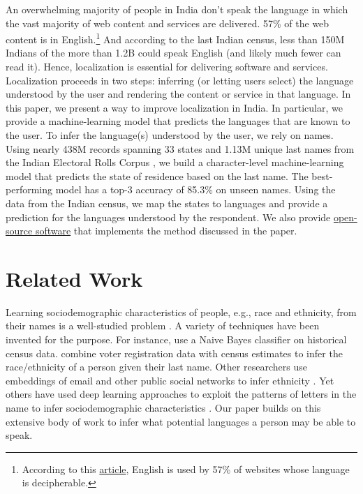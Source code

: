\documentclass[11pt,  letterpaper]{article}
\begin{document}
An overwhelming majority of people in India don’t speak the language in which the vast majority of web content and services are delivered. 57\% of the web content is in English.\footnote{According to this \href{https://w3techs.com/technologies/overview/content_language}{article}, English is used by 57\% of websites whose language is decipherable.} And according to the last Indian census, less than 150M Indians of the more than 1.2B could speak English (and likely much fewer can read it). Hence, localization is essential for delivering software and services. Localization proceeds in two steps: inferring (or letting users select) the language understood by the user and rendering the content or service in that language. In this paper, we present a way to improve localization in India. In particular, we provide a machine-learning model that predicts the languages that are known to the user. To infer the language(s) understood by the user, we rely on names. Using nearly 438M records spanning 33 states and 1.13M unique last names from the Indian Electoral Rolls Corpus \citep{DVN/OG47IV_2023}, we build a character-level machine-learning model that predicts the state of residence based on the last name. The best-performing model has a top-3 accuracy of 85.3\%  on unseen names. Using the data from the Indian census, we map the states to languages and provide a prediction for the languages understood by the respondent. We also provide \href{https://github.com/in-rolls/instate}{open-source software} that implements the method discussed in the paper.

\section{Related Work}
Learning sociodemographic characteristics of people, e.g., race and ethnicity, from their names is a well-studied problem \citep{imai2016improving, parasurama2021racebert, wong2020machine, ye2017nationality, sood2018predicting}. A variety of techniques have been invented for the purpose. For instance, \citet{blevins2015jane} use a Naive Bayes classifier on historical census data. \citet{imai2016improving} combine voter registration data with census estimates to infer the race/ethnicity of a person given their last name. Other researchers use embeddings of email and other public social networks to infer ethnicity \citep{ye2017nationality, hur2022malaysian, junting_skiena}. Yet others have used deep learning approaches to exploit the patterns of letters in the name to infer sociodemographic characteristics \citep{hu2021s, sood2018predicting, parasurama2021racebert}. Our paper builds on this extensive body of work to infer what potential languages a person may be able to speak.
\end{document}
